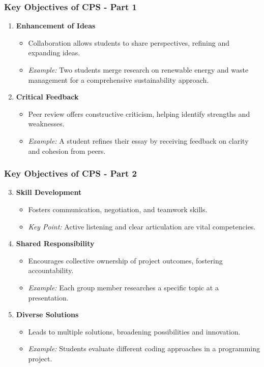 \documentclass{beamer}
\begin{document}
\begin{frame}[fragile]
    \frametitle{Key Objectives of CPS - Part 1}
    \begin{enumerate}
        \item \textbf{Enhancement of Ideas}
        \begin{itemize}
            \item Collaboration allows students to share perspectives, refining and expanding ideas.
            \item \textit{Example:} Two students merge research on renewable energy and waste management for a comprehensive sustainability approach.
        \end{itemize}

        \item \textbf{Critical Feedback}
        \begin{itemize}
            \item Peer review offers constructive criticism, helping identify strengths and weaknesses.
            \item \textit{Example:} A student refines their essay by receiving feedback on clarity and cohesion from peers.
        \end{itemize}
    \end{enumerate}
\end{frame}

\begin{frame}[fragile]
    \frametitle{Key Objectives of CPS - Part 2}
    \begin{enumerate}
        \setcounter{enumi}{2} %
        \item \textbf{Skill Development}
        \begin{itemize}
            \item Fosters communication, negotiation, and teamwork skills.
            \item \textit{Key Point:} Active listening and clear articulation are vital competencies.
        \end{itemize}

        \item \textbf{Shared Responsibility}
        \begin{itemize}
            \item Encourages collective ownership of project outcomes, fostering accountability.
            \item \textit{Example:} Each group member researches a specific topic at a presentation.
        \end{itemize}

        \item \textbf{Diverse Solutions}
        \begin{itemize}
            \item Leads to multiple solutions, broadening possibilities and innovation.
            \item \textit{Example:} Students evaluate different coding approaches in a programming project.
        \end{itemize}
    \end{enumerate}
\end{frame}
\end{document}
